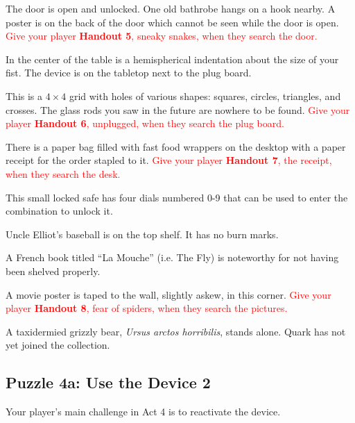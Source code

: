 \documentclass[a6paper, parskip=half, DIV=14, 12pt]{scrartcl}
\begin{document}
\begin{description}[leftmargin=0pt]
\item[Door (E)] The door is open and unlocked. One old bathrobe hangs on a hook nearby. A poster is on the back of the door which cannot be seen while the door is open.
\textcolor{Red}{Give your player \textbf{Handout 5}, sneaky snakes, when they search the door.}

\item[Table (C)] In the center of the table is a hemispherical indentation about the size of your fist. The device is on the tabletop next to the plug board.

\item[Plug Board (C)] This is a $4 \times 4$ grid with holes of various shapes: squares, circles, triangles, and crosses. The glass rods you saw in the future are nowhere to be found.
\textcolor{Red}{Give your player \textbf{Handout 6}, unplugged, when they search the plug board.}

\item[Desk (W)] There is a paper bag filled with fast food wrappers on the desktop  with a paper receipt for the order stapled to it.
\textcolor{Red}{Give your player \textbf{Handout 7}, the receipt, when they search the desk.}

\item[Safe (W)] This small locked safe has four dials numbered 0-9 that can be used to enter the combination to unlock it.

\item[Shelves (NW)] Uncle Elliot's baseball is on the top shelf. It has no burn marks.

\item[Bookcases (NE)] A French book titled ``La Mouche'' (i.e. The Fly) is noteworthy for not having been shelved properly.

\item[Pictures (SE)] A movie poster is taped to the wall, slightly askew, in this corner.
\textcolor{Red}{Give your player \textbf{Handout 8}, fear of spiders, when they search the pictures.}

\item[Animals (SW)] A taxidermied grizzly bear, \textit{Ursus arctos horribilis}, stands alone. Quark has not yet joined the collection.

\end{description}

\newpage

\subsection*{Puzzle 4a: Use the Device 2}
Your player's main challenge in Act 4 is to reactivate the device.
\end{document}
